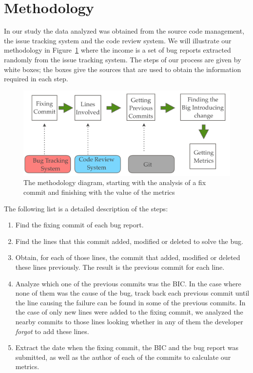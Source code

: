\documentclass[10pt, conference]{IEEEtran}
\begin{document}
\section{Methodology}
\label{sec:methodology}

In our study the data analyzed was obtained from the source code management, the issue tracking system and the code review system. We will illustrate our methodology in Figure~\ref{fig:methodology} where the income is a set of bug reports extracted randomly from the issue tracking system. The steps of our process are given by white boxes; the  boxes give the sources that are used to obtain the information required in each step.

\begin{figure}[ht]
\centering
\includegraphics[width=\columnwidth]{methodology.png}
\caption{The methodology diagram, starting with the analysis of a fix commit and finishing with the value of the metrics}
\label{fig:methodology}       %
\end{figure}

The following list is a detailed description of the steps: 

\begin{enumerate}
		\item Find the fixing commit of each bug report.
		\item Find the lines that this commit added, modified or deleted to solve the bug.
		\item Obtain, for each of those lines, the commit that added, modified or deleted these lines previously. The result is the previous commit for each line.
		\item Analyze which one of the previous commits was the BIC. In the case where none of them was the cause of the bug, track back each previous commit until the line causing the failure can be found in some of the previous commits. In the case of only new lines were added to the fixing commit, we analyzed the nearby commits to those lines looking whether in any of them the developer \emph{forgot} to add these lines.
		\item Extract the date when the fixing commit, the BIC and the bug report was submitted, as well as the author of each of the commits to calculate our metrics.	
\end{enumerate} 
\end{document}
